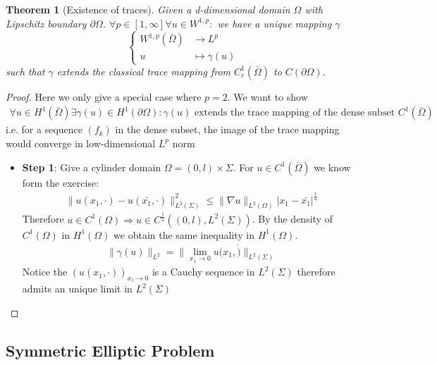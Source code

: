 \documentclass[a4paper,11pt,oneside,fleqn]{book}
\newtheorem{theorem}{Theorem}[section]
\theoremstyle{definition}
\theoremstyle{remark}
\begin{document}
\begin{theorem}[Existence of traces]
	Given a d-dimensional domain $\Omega$ with Lipschitz boundary $\partial \Omega$. $\forall p \in [1, \infty] \forall u \in W^{1, p}:$ we have a unique mapping $\gamma$
	\begin{equation*}
	\left\{
	\begin{aligned}
		W^{1, p}(\bar{\Omega}) &\rightarrow L^p\\
		u &\mapsto \gamma(u) 
	\end{aligned}
	\right.	
	\end{equation*}
	such that $\gamma$ extends the classical trace mapping from $C^1_c(\bar{\Omega})$ to $C(\partial\Omega)$.
\end{theorem}
\begin{proof}
	Here we only give a special case where $p = 2$. We want to show
	\begin{align*}
		\forall u \in H^1(\bar{\Omega})\exists \gamma(u) \in H^1(\partial \Omega): \text{$\gamma(u)$ extends the trace mapping of the dense subset $C^1(\bar{\Omega})$}
	\end{align*}
	i.e. for a sequence $(f_k)$ in the dense subset, the image of the trace mapping would converge in low-dimensional $L^p$ norm
\begin{itemize}
\item \textbf{Step 1}: Give a cylinder domain $\Omega = (0, l) \times \Sigma$. For $u \in C^1(\bar{\Omega})$ we know form the exercise:
	\begin{align*}
		\|u(x_1, \cdot) - u(\bar{x_1}, \cdot)\|_{L^2(\Sigma)}^2 \leq 
		\|\nabla u\|_{L^2(\Omega)} |x_1 - \bar{x_1}|^{\frac{1}{2}}
	\end{align*}
    Therefore $u \in C^1(\Omega) \Rightarrow u \in C^{\frac{1}{2}}((0, l), L^2(\Sigma))$. By the density of $C^1(\Omega)$ in $H^1(\Omega)$ we obtain the same inequality in $H^1(\Omega)$.
    \begin{align*}
    	\|\gamma(u)\|_{L^2} = \|\lim_{x_1 \rightarrow 0} u(x_1, \dot)\|_{L^2(\Sigma)}
    \end{align*}
    Notice the $(u(x_1, \cdot))_{x_1 \rightarrow 0}$ is a Cauchy sequence in $L^2(\Sigma)$ therefore admits an unique limit in $L^2(\Sigma)$
\end{itemize}
\end{proof}


\subsection{Symmetric Elliptic Problem}
\end{document}
